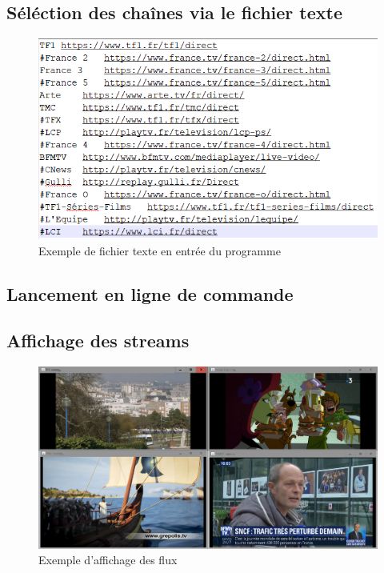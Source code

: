\documentclass{polytech/polytech}
\begin{document}
\subsection{Séléction des chaînes via le fichier texte}

\begin{figure}
	\includegraphics[scale=0.5]{images/textFile.png}
	\caption{Exemple de fichier texte en entrée du programme}
	\label{fig:textFile}
\end{figure}


\subsection{Lancement en ligne de commande}

\subsection{Affichage des streams}


\begin{figure}
	\includegraphics[scale=0.5]{images/affichageFlux.png}
	\caption{Exemple d'affichage des flux}
	\label{fig:affichageFlux}
\end{figure}
\end{document}
